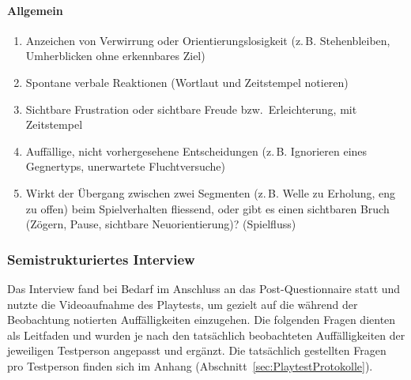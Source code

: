 \documentclass[../Main.tex]{subfiles}
\begin{document}
\paragraph{Allgemein}
\begin{enumerate}[label=\textbf{B\arabic*}, leftmargin=1.5cm, itemsep=0.5em, resume]
    \item Anzeichen von Verwirrung oder Orientierungslosigkeit (z.\,B. Stehenbleiben, Umherblicken ohne erkennbares Ziel)
    \item Spontane verbale Reaktionen (Wortlaut und Zeitstempel notieren)
    \item Sichtbare Frustration oder sichtbare Freude bzw.\ Erleichterung, mit Zeitstempel
    \item Auffällige, nicht vorhergesehene Entscheidungen (z.\,B. Ignorieren eines Gegnertyps, unerwartete Fluchtversuche)
    \item Wirkt der Übergang zwischen zwei Segmenten (z.\,B. Welle zu Erholung, eng zu offen) beim Spielverhalten fliessend, oder gibt es einen sichtbaren Bruch (Zögern, Pause, sichtbare Neuorientierung)? \hfill (Spielfluss)
\end{enumerate}

\subsubsection{Semistrukturiertes Interview} \label{sec:Interview}

Das Interview fand bei Bedarf im Anschluss an das Post-Questionnaire statt und nutzte die Videoaufnahme des Playtests, um gezielt auf die während der Beobachtung notierten Auffälligkeiten einzugehen. Die folgenden Fragen dienten als Leitfaden und wurden je nach den tatsächlich beobachteten Auffälligkeiten der jeweiligen Testperson angepasst und ergänzt. Die tatsächlich gestellten Fragen pro Testperson finden sich im Anhang (Abschnitt~\ref{sec:PlaytestProtokolle}).
\end{document}
